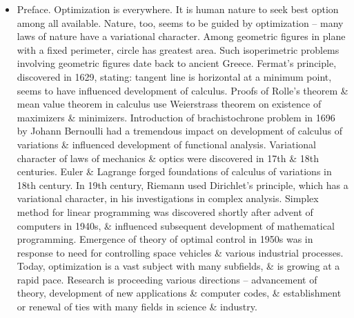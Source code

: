 \documentclass{article}
\begin{document}
\begin{itemize}
    \item {\sf Preface.} Optimization is everywhere. It is human nature to seek best option among all available. Nature, too, seems to be guided by optimization -- many laws of nature have a variational character. Among geometric figures in plane with a fixed perimeter, circle has greatest area. Such isoperimetric problems involving geometric figures date back to ancient Greece. Fermat's principle, discovered in 1629, stating: tangent line is horizontal at a minimum point, seems to have influenced development of calculus. Proofs of Rolle's theorem \& mean value theorem in calculus use Weierstrass theorem on existence of maximizers \& minimizers. Introduction of brachistochrone problem in 1696 by {\sc Johann Bernoulli} had a tremendous impact on development of calculus of variations \& influenced development of functional analysis. Variational character of laws of mechanics \& optics were discovered in 17th \& 18th centuries. Euler \& Lagrange forged foundations of calculus of variations in 18th century. In 19th century, {\sc Riemann} used Dirichlet's principle, which has a variational character, in his investigations in complex analysis. Simplex method for linear programming was discovered shortly after advent of computers in 1940s, \& influenced subsequent development of mathematical programming. Emergence of theory of optimal control in 1950s was in response to need for controlling space vehicles \& various industrial processes. Today, optimization is a vast subject with many subfields, \& is growing at a rapid pace. Research is proceeding various directions -- advancement of theory, development of new applications \& computer codes, \& establishment or renewal of ties with many fields in science \& industry.


\end{itemize}
\end{document}
